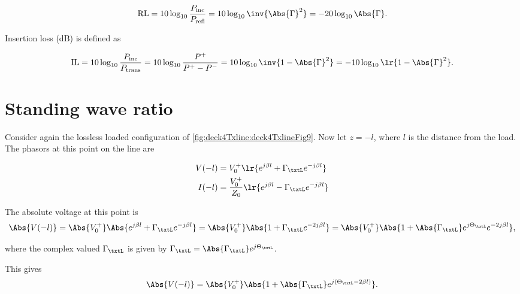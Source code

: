 \begin{dmath}\label{eqn:uwaves4TransmissionLines:1060}
\textrm{RL} 
= 10 \log_{10} \frac{P_{\textrm{inc}}}{P_{\textrm{refl}}} 
= 10 \log_{10} \inv{\Abs{\Gamma}^2}
= -20 \log_{10} \Abs{\Gamma}.
\end{dmath}

Insertion loss (dB) is defined as

\begin{dmath}\label{eqn:uwaves4TransmissionLines:1080}
\textrm{IL} 
= 10 \log_{10} \frac{P_{\textrm{inc}}}{P_{\textrm{trans}}} 
= 10 \log_{10} \frac{P^{+}}{P^{+} - P^{-}}
= 10 \log_{10} \inv{1 - \Abs{\Gamma}^2}
= -10 \log_{10} \lr{ 1 - \Abs{\Gamma}^2 }.
\end{dmath}

\section{Standing wave ratio}

Consider again the lossless loaded configuration of \cref{fig:deck4Txline:deck4TxlineFig9}.  Now let \( z = - l \), where \( l \) is the distance from the load.  The phasors at this point on the line are

\begin{equation}\label{eqn:uwaves4TransmissionLines:1100}
\begin{aligned}
V(-l) &= V_0^{+} \lr{ e^{j \beta l} + \Gamma_\txtL e^{-j \beta l} } \\
I(-l) &= \frac{V_0^{+}}{Z_0} \lr{ e^{j \beta l} - \Gamma_\txtL  e^{-j \beta l} } \\
\end{aligned}
\end{equation}

The absolute voltage at this point is
\begin{dmath}\label{eqn:uwaves4TransmissionLines:1120}
\Abs{V(-l)} 
= \Abs{V_0^{+}} \Abs{ e^{j \beta l} + \Gamma_\txtL e^{-j \beta l} }
= \Abs{V_0^{+}} \Abs{ 1 + \Gamma_\txtL e^{-2 j \beta l} }
= \Abs{V_0^{+}} \Abs{ 1 + \Abs{\Gamma_\txtL} e^{j \Theta_\txtL} e^{-2 j \beta l} },
\end{dmath}

where the complex valued \( \Gamma_\txtL \) is given by \( \Gamma_\txtL = \Abs{\Gamma_\txtL} e^{j \Theta_\txtL} \).

This gives
\begin{equation}\label{eqn:uwaves4TransmissionLines:1140}
\Abs{V(-l)} 
= \Abs{V_0^{+}} \Abs{ 1 + \Abs{\Gamma_\txtL} e^{j(\Theta_\txtL -2 \beta l)} }.
\end{equation}

